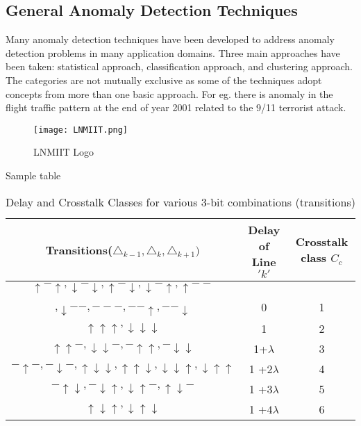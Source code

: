 \subsection{General Anomaly Detection Techniques}
Many anomaly detection techniques have been developed to address anomaly detection problems in many application domains. Three main approaches have been taken: statistical approach, classification approach, and clustering approach. The categories are not mutually exclusive as some of the techniques adopt concepts from more than one basic approach. 
For eg. there is anomaly in the flight traffic pattern at the end of year 2001 related to the 9/11 terrorist attack.

\begin{figure}[h]
\centering
\texttt{[image: LNMIIT.png]}
\caption{LNMIIT Logo }
\label{figure:1}
\end{figure}


Sample table
\begin{table}[t]
\centering
\begin{tabular}{|c|c|c|}
\hline
Transitions($\triangle_{k-1}, \triangle_k, \triangle_{k+1})$ & Delay of Line $'k'$ & Crosstalk class $C_c$\\
\hline

$\uparrow-\uparrow , \downarrow-\downarrow, \uparrow-\downarrow, \downarrow-\uparrow, \uparrow- -$ & & \\

,$ \downarrow - -, - - -, - - \uparrow, - - \downarrow$  & 0 & 1\\
\hline

$\uparrow\uparrow\uparrow, \downarrow\downarrow\downarrow $& 1 & 2\\
\hline

$\uparrow\uparrow -, \downarrow\downarrow-, -\uparrow\uparrow, -\downarrow\downarrow$ & 1+$\lambda$ &3\\
\hline

$-\uparrow-, -\downarrow-, \uparrow\downarrow\downarrow, \uparrow\uparrow\downarrow, \downarrow\downarrow\uparrow, \downarrow\uparrow\uparrow$ & 1 +$2\lambda$ & 4\\
\hline

$-\uparrow\downarrow, -\downarrow\uparrow, \downarrow\uparrow-, \uparrow\downarrow-$ & 1 +$3\lambda$ & 5\\
\hline

$\uparrow\downarrow\uparrow, \downarrow\uparrow\downarrow $ & 1 +$4\lambda$ & 6\\
\hline

\end{tabular}
\caption{Delay and Crosstalk Classes for various 3-bit combinations (transitions)}
\label{tab:}
\end{table}
